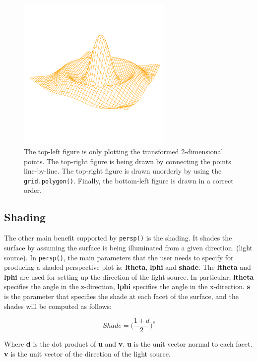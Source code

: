 \documentclass[11pt,twoside]{report}
\begin{document}
\begin{figure}[h]
\begin{center}
		\includegraphics[height = 7.5cm, width = 7.5cm]{figure/standalone_p_4.pdf}
		\caption{The top-left figure is only plotting the transformed 2-dimensional points. The top-right figure is being drawn by connecting the points line-by-line. The top-right figure is drawn unorderly by using the \texttt{grid.polygon()}. Finally, the bottom-left figure is drawn in a correct order.}
		\label{figure_3.2}
	\end{center}
\end{figure}

\subsection{Shading}
The other main benefit supported by \texttt{persp()} is the shading. It shades the surface by assuming the surface is being illuminated from a given direction. (light source). In \texttt{persp()}, the main parameters that the user needs to specify for producing a shaded perspective plot is: \textbf{ltheta}, \textbf{lphi} and \textbf{shade}. The \textbf{ltheta} and \textbf{lphi} are used for setting up the direction of the light source. In particular, \textbf{ltheta} specifies the angle in the z-direction, \textbf{lphi} specifies the angle in the x-direction. \textbf{s} is the parameter that specifies the shade at each facet of the surface, and the shades will be computed as follows:

\begin{equation}
Shade = \big(\frac{1 + d}{2}\big)^{s}
\end{equation}

Where \textbf{d} is the dot product of \textbf{u} and \textbf{v}. \textbf{u} is the unit vector normal to each facet. \textbf{v} is the unit vector of the direction of the light source.\\
\end{document}
